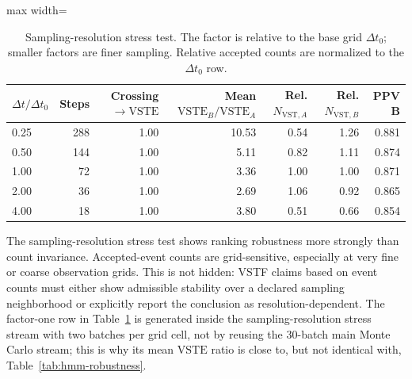 \documentclass[11pt,a4paper]{article}
\newcommand{\VST}{\ensuremath{\mathrm{VST}}}
\newcommand{\VSTE}{\ensuremath{\mathrm{VSTE}}}
\newcommand{\1}{\mathbf{1}}
\begin{document}
\begin{table}[h]
\centering
\caption{Sampling-resolution stress test. The factor is relative to the base grid $\Delta t_0$; smaller factors are finer sampling. Relative accepted counts are normalized to the $\Delta t_0$ row.}
\label{tab:hmm-sampling}
\small
\begin{adjustbox}{max width=\linewidth}
\begin{tabular}{lrrrrrr}
\toprule
$\Delta t/\Delta t_0$ & Steps & Crossing$\to$\VSTE{} & Mean $\VSTE_B/\VSTE_A$ & Rel. $N_{\VST,A}$ & Rel. $N_{\VST,B}$ & PPV B \\
\midrule
0.25 & 288 & 1.00 & 10.53 & 0.54 & 1.26 & 0.881 \\
0.50 & 144 & 1.00 & 5.11 & 0.82 & 1.11 & 0.874 \\
1.00 & 72 & 1.00 & 3.36 & 1.00 & 1.00 & 0.871 \\
2.00 & 36 & 1.00 & 2.69 & 1.06 & 0.92 & 0.865 \\
4.00 & 18 & 1.00 & 3.80 & 0.51 & 0.66 & 0.854 \\
\bottomrule
\end{tabular}
\end{adjustbox}
\end{table}

The sampling-resolution stress test shows ranking robustness more strongly than count invariance. Accepted-event counts are grid-sensitive, especially at very fine or coarse observation grids. This is not hidden: VSTF claims based on event counts must either show admissible stability over a declared sampling neighborhood or explicitly report the conclusion as resolution-dependent. The factor-one row in Table~\ref{tab:hmm-sampling} is generated inside the sampling-resolution stress stream with two batches per grid cell, not by reusing the 30-batch main Monte Carlo stream; this is why its mean \VSTE{} ratio is close to, but not identical with, Table~\ref{tab:hmm-robustness}.
\end{document}
